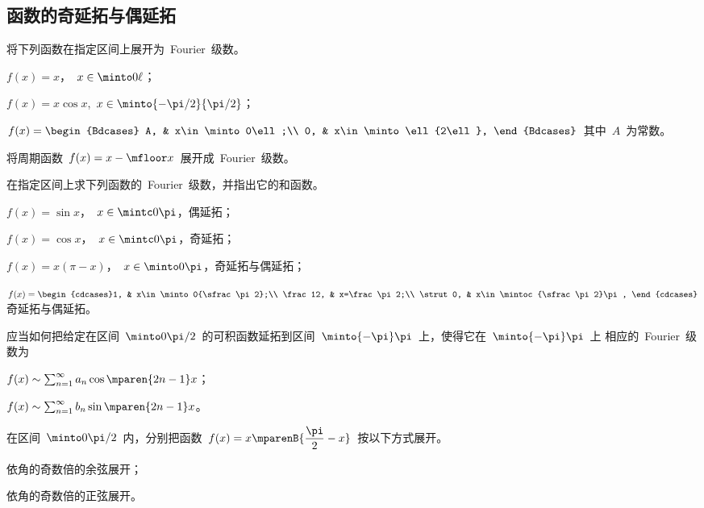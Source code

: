 \subsection{函数的奇延拓与偶延拓}
\begin{exercise}
\item 将下列函数在指定区间上展开为~Fourier~级数。
\begin{exlistcols}
  \item $f(x)=x$，~$x\in\minto0\ell$；
  \item $f(x)=x\cos x$,~$x\in\minto{-\sfrac\pi2}{\sfrac\pi2}$；
  \item $f(x)=\begin{Bdcases}
    A, & x\in\minto0\ell;\\
    0, & x\in\minto\ell{2\ell},
  \end{Bdcases}$~其中~$A$~为常数。
\end{exlistcols}
\item 将周期函数~$f(x)=x-\mfloor x$~展开成~Fourier~级数。
\item 在指定区间上求下列函数的~Fourier~级数，并指出它的和函数。
\begin{exlistcols}
  \item $f(x)=\sin x$，~$x\in\mintc0\pi$，偶延拓；
  \item $f(x)=\cos x$，~$x\in\mintc0\pi$，奇延拓；
  \item $f(x)=x(\pi-x)$，~$x\in\minto0\pi$，奇延拓与偶延拓；
  \item $f(x)=\begin{cdcases}%
    1, & x\in\minto 0{\sfrac\pi2};\\
    \frac12, & x=\frac\pi2;\\
    \strut0, & x\in\mintoc{\sfrac\pi2}\pi,
  \end{cdcases}$奇延拓与偶延拓。
\end{exlistcols}
\item 应当如何把给定在区间~$\minto 0{\sfrac\pi2}$~的可积函数延拓到区间~$\minto{-\pi}\pi$~上，使得它在~$\minto{-\pi}\pi$~上
相应的~Fourier~级数为
\begin{exlistcols}
  \item $f(x)\sim\sum_{n=1}^\sinf a_n\cos\mparen{2n-1}x$；
  \item $f(x)\sim\sum_{n=1}^\sinf b_n\sin\mparen{2n-1}x$。
\end{exlistcols}
\item 在区间~$\minto 0{\sfrac\pi2}$~内，分别把函数~$f(x)=x\mparenB{\dfrac\pi2-x}$~按以下方式展开。
\begin{exlistcols}
  \item 依角的奇数倍的余弦展开；
  \item 依角的奇数倍的正弦展开。
\end{exlistcols}

\end{exercise}

